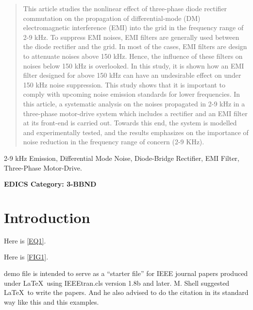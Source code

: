 \documentclass[journal,a4paper,10pt,twoside]{IEEEtran} %
\begin{document}
	\begin{abstract}
		This article studies the nonlinear effect of three-phase diode rectifier commutation on the propagation of differential-mode (DM) electromagnetic interference (EMI) into the grid in the frequency range of 2-9 kHz. To suppress EMI noises, EMI filters are generally used between the diode rectifier and the grid. In most of the cases, EMI filters are design to attenuate noises above 150 kHz. Hence, the influence of these filters on noises below 150 kHz is overlooked. In this study, it is shown how an EMI filter designed for above 150 kHz can have an undesirable effect on under 150 kHz noise suppression. This study shows that it is important to comply with upcoming noise emission standards for lower frequencies. In this article, a systematic analysis on the noises propagated in 2-9 kHz in a three-phase motor-drive system which includes a rectifier and an EMI filter at its front-end is carried out. Towards this end, the system is modelled and experimentally tested, and the results emphasizes on the importance of noise reduction in the frequency range of concern (2-9 KHz).
	\end{abstract}
	
	\begin{IEEEkeywords}
        2-9 kHz Emission, Differential Mode Noise, Diode-Bridge Rectifier, EMI Filter, Three-Phase Motor-Drive.
    \end{IEEEkeywords}
	
	\ifCLASSOPTIONpeerreview
	\begin{center} \bfseries EDICS Category: 3-BBND \end{center}		%
	\fi
	\IEEEpeerreviewmaketitle											%
	
	\section{Introduction}
	
	Here is \eqref{EQ1}.

	
	Here is \ref{FIG1}.
	
	
	
	 demo file is intended to serve as a ``starter file''
	for IEEE journal papers produced under \LaTeX\ using
	IEEEtran.cls version 1.8b and later. M. Shell suggested \LaTeX\ to write the papers. And he also advised to do the citation in its standard way like this \cite{pantic} and this \cite{farajizadeh} examples.
	
\end{document}
